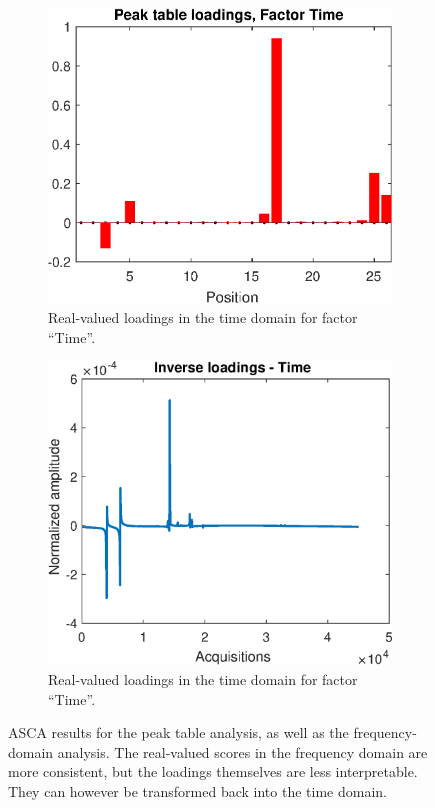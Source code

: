 \documentclass[preprint,12pt]{elsarticle}
\begin{document}
\begin{figure}[hbtp!]
\begin{subfigure}[b]{0.45\textwidth}
        \centering
        \includegraphics[width=\textwidth]{figures/peak_loads_time.eps}
        \caption{Real-valued loadings in the time domain for factor ``Time''.}
        \label{fig:figure5}
    \end{subfigure}
    \hfill
    \begin{subfigure}[b]{0.45\textwidth}
        \centering
        \includegraphics[width=\textwidth]{figures/time_peaks.eps}
        \caption{Real-valued loadings in the time domain for factor ``Time''.}
        \label{fig:figure5}
    \end{subfigure}
    \caption{ASCA results for the peak table analysis, as well as the frequency-domain analysis. The real-valued scores in the frequency domain are more consistent, but the loadings themselves are less interpretable. They can however be transformed back into the time domain.}
    \label{fig:subfigures}
\end{figure}
\end{document}
